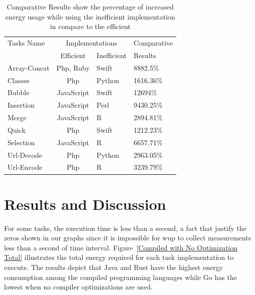 \begin{table}
	\begin{threeparttable}
		\caption{Comparative Results show the percentage of increased energy usage while using the inefficient implementation in compare to the efficient}
		\label{Interpreted Energy Results}
		\begin{tabular}{lcll}
			\toprule
			Tasks Name	& \multicolumn{2}{c}{Implementations} & Comparative\\
						& Efficient	& Inefficient	& Results\\
			\midrule
			Array-Concat& Php, Ruby	& Swift			& 8882.5\% \\
			Classes		& Php		& Python		& 1616.36\% \\
			Bubble		& JavaScript& Swift			& 12694\% \\
			Insertion	& JavaScript& Perl			& 9430.25\% \\
			Merge		& JavaScript& R 			& 2894.81\% \\
			Quick 		& Php		& Swift			& 1212.23\% \\
			Selection	& JavaScript& R				& 6657.71\% \\
			Url-Decode	& Php		& Python		& 2963.05\% \\
			Url-Encode	& Php		& R				& 3239.79\% \\
			\bottomrule
		\end{tabular}
	\end{threeparttable}
\end{table}


\section{Results and Discussion} \label{results_and_discussion}
For some tasks, the execution time is less than a second, a fact
that justify the zeros shown in our graphs since it is impossible 
for {\sc wup} to collect measurements less than a second of time 
interval.
Figure~\ref{Compiled with No Optimization Total} illustrates 
the total energy required for each task implementation to execute.
The results depict that Java and Rust have the highest 
energy consumption among the compiled programming languages while 
Go has the lowest when no compiler optimizations are used. 


